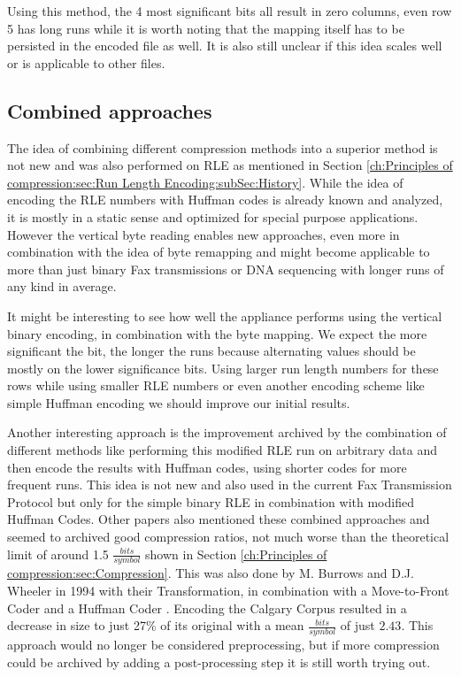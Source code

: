 \par{
\arraydump\dataC

Using this method, the 4 most significant bits all result in zero columns, even row 5 has long runs while it is worth noting that the mapping itself has to be persisted in the encoded file as well. It is also still unclear if this idea scales well or is applicable to other files.
}

\subsection{Combined approaches}
\par{
The idea of combining different compression methods into a superior method is not new and was also performed on RLE as mentioned in Section \ref{ch:Principles of compression:sec:Run Length Encoding:subSec:History}. While the idea of encoding the RLE numbers with Huffman codes is already known and analyzed, it is mostly in a static sense and optimized for special purpose applications. However the vertical byte reading enables new approaches, even more in combination with the idea of byte remapping and might become applicable to more than just binary Fax transmissions or DNA sequencing with longer runs of any kind in average.
}
\par{
It might be interesting to see how well the appliance performs using the vertical binary encoding, in combination with the byte mapping. We expect the more significant the bit, the longer the runs because alternating values should be mostly on the lower significance bits. Using larger run length numbers for these rows while using smaller RLE numbers or even another encoding scheme like simple Huffman encoding we should improve our initial results.
}
\par{
Another interesting approach is the improvement archived by the combination of different methods like performing this modified RLE run on arbitrary data and then encode the results with Huffman codes, using shorter codes for more frequent runs. This idea is not new and also used in the current Fax Transmission Protocol but only for the simple binary RLE in combination with modified Huffman Codes. Other papers also mentioned these combined approaches and seemed to archived good compression ratios, not much worse than the theoretical limit of around 1.5 $\frac{bits}{symbol}$ shown in Section \ref{ch:Principles of compression:sec:Compression}. This was also done by M. Burrows and D.J. Wheeler in 1994 with their Transformation, in combination with a Move-to-Front Coder and a Huffman Coder \cite{Burrows94}. Encoding the Calgary Corpus resulted in a decrease in size to just 27\% of its original with a mean $\frac{bits}{symbol}$ of just $2.43$. This approach would no longer be considered preprocessing, but if more compression could be archived by adding a post-processing step it is still worth trying out.}

